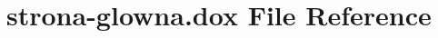 \hypertarget{strona-glowna_8dox}{\section{strona-\/glowna.dox File Reference}
\label{strona-glowna_8dox}
}

